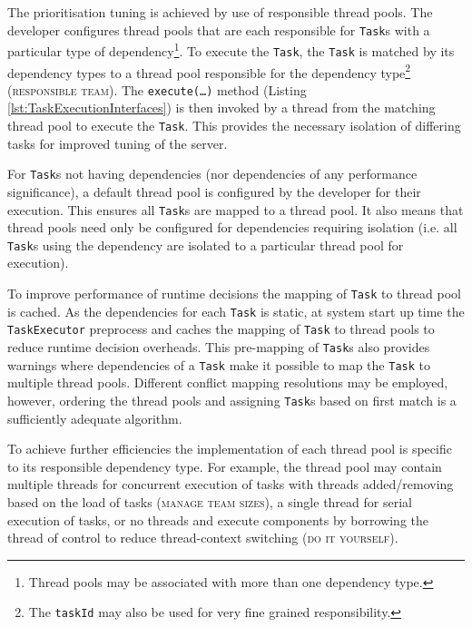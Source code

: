 \documentclass[prodmode]{style/acmlarge}
\begin{document}
The prioritisation tuning is achieved by use of responsible thread pools.  The
developer configures thread pools that are each responsible for \texttt{Task}s
with a particular type of dependency\footnote{Thread pools may be associated
with more than one dependency type.}.  To execute the \texttt{Task}, the
\texttt{Task} is matched by its dependency types to a thread pool responsible
for the dependency type\footnote{The \texttt{taskId} may also be used for very
fine grained responsibility.} (\textsc{responsible team}).  The
\texttt{execute(\ldots)} method (Listing \ref{lst:TaskExecutionInterfaces}) is
then invoked by a thread from the matching thread pool to execute the
\texttt{Task}.  This provides the necessary isolation of differing tasks for
improved tuning of the server.

For \texttt{Task}s not having dependencies (nor dependencies of any performance
significance), a default thread pool is configured by the developer for their
execution.  This ensures all \texttt{Task}s are mapped to a thread pool.  It
also means that thread pools need only be configured for dependencies requiring
isolation (i.e. all \texttt{Task}s using the dependency are isolated to a
particular thread pool for execution).

To improve performance of runtime decisions the mapping of \texttt{Task} to
thread pool is cached.  As the dependencies for each \texttt{Task} is static, at
system start up time the \texttt{TaskExecutor} preprocess and caches the
mapping of \texttt{Task} to thread pools to reduce runtime decision overheads.
This pre-mapping of \texttt{Task}s also provides warnings where dependencies of
a \texttt{Task} make it possible to map the \texttt{Task} to multiple thread
pools.  Different conflict mapping resolutions may be employed, however,
ordering the thread pools and assigning \texttt{Task}s based on first match is a
sufficiently adequate algorithm.

To achieve further efficiencies the implementation of each thread pool is
specific to its responsible dependency type.  For example, the thread pool may
contain multiple threads for concurrent execution of tasks with threads
added/removing based on the load of tasks (\textsc{manage team sizes}), a single
thread for serial execution of tasks, or no threads and execute components by
borrowing the thread of control to reduce thread-context switching (\textsc{do it
yourself}).
\end{document}
